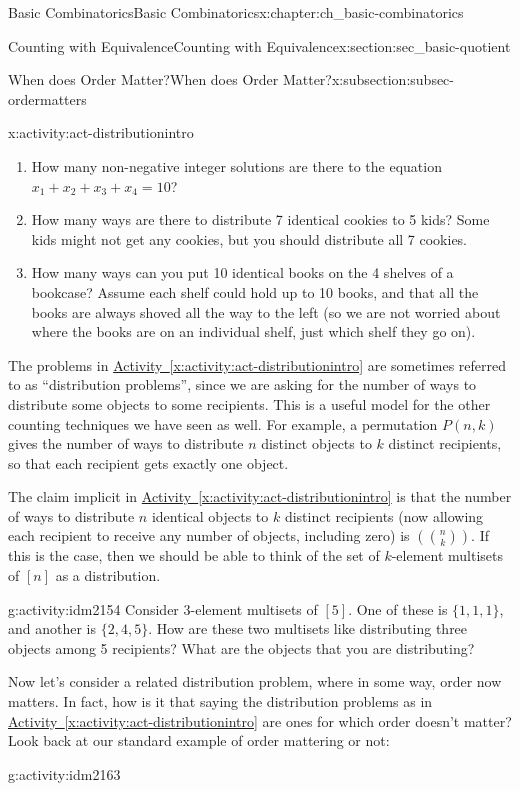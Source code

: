\documentclass[oneside,10pt,]{book}
\numberwithin{equation}{chapter}
\newcommand{\mchoose}[2]{\left(\!\binom{#1}{#2}\!\right)}
\begin{document}
\begin{chapterptx}{Basic Combinatorics}{}{Basic Combinatorics}{}{}{x:chapter:ch_basic-combinatorics}
\begin{sectionptx}{Counting with Equivalence}{}{Counting with Equivalence}{}{}{x:section:sec_basic-quotient}
\begin{subsectionptx}{When does Order Matter?}{}{When does Order Matter?}{}{}{x:subsection:subsec-ordermatters}
\begin{activity}{}{x:activity:act-distributionintro}
\begin{enumerate}[font=\bfseries,label=(\alph*),ref=\alph*]
\item{}How many non-negative integer solutions are there to the equation \(x_1 + x_2 + x_3 + x_4 = 10\)?%
\item{}How many ways are there to distribute 7 identical cookies to 5 kids? Some kids might not get any cookies, but you should distribute all 7 cookies.%
\item{}How many ways can you put 10 identical books on the 4 shelves of a bookcase?  Assume each shelf could hold up to 10 books, and that all the books are always shoved all the way to the left (so we are not worried about where the books are on an individual shelf, just which shelf they go on).%
\end{enumerate}
\end{activity}
The problems in \hyperref[x:activity:act-distributionintro]{Activity~\ref{x:activity:act-distributionintro}} are sometimes referred to as ``distribution problems'', since we are asking for the number of ways to distribute some objects to some recipients.   This is a useful model for the other counting techniques we have seen as well.  For example, a permutation \(P(n,k)\) gives the number of ways to distribute \(n\) distinct objects to \(k\) distinct recipients, so that each recipient gets exactly one object.%
\par
The claim implicit in \hyperref[x:activity:act-distributionintro]{Activity~\ref{x:activity:act-distributionintro}} is that the number of ways to distribute \(n\) identical objects to \(k\) distinct recipients (now allowing each recipient to receive any number of objects, including zero) is \(\mchoose{n}{k}\).  If this is the case, then we should be able to think of the set of \(k\)-element multisets of \([n]\) as a distribution.%
\begin{activity}{}{g:activity:idm2154}%
Consider \(3\)-element multisets of \([5]\).  One of these is \(\{1,1,1\}\), and another is \(\{2,4,5\}\).  How are these two multisets like distributing three objects among 5 recipients?  What are the objects that you are distributing?%
\end{activity}
Now let's consider a related distribution problem, where in some way, order now matters.  In fact, how is it that saying the distribution problems as in \hyperref[x:activity:act-distributionintro]{Activity~\ref{x:activity:act-distributionintro}} are ones for which order doesn't matter?  Look back at our standard example of order mattering or not:%
\begin{activity}{}{g:activity:idm2163}%
\begin{enumerate}[font=\bfseries,label=(\alph*),ref=\alph*]

\end{enumerate}
\end{activity}
\end{subsectionptx}
\end{sectionptx}
\end{chapterptx}
\end{document}
